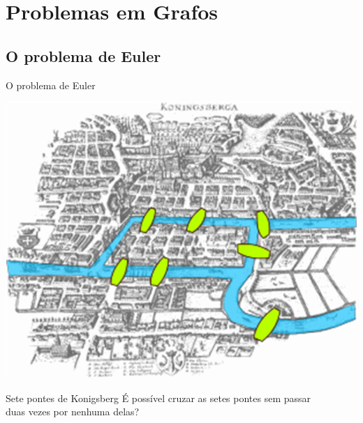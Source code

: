 \documentclass[xcolor=dvipsnames,table]{beamer}
\begin{document}
	\section{Problemas em Grafos}
	\subsection{O problema de Euler}
	\begin{frame}[shrink]{O problema de Euler}
		\begin{center}
    		\includegraphics[height=.6\textheight]{images/konigsberg.png}
  		\end{center} \pause
		\begin{alertblock}{Sete pontes de Konigsberg} \pause
			É possível cruzar as setes pontes sem passar \\
			duas vezes por nenhuma delas?
		\end{alertblock}
	\end{frame}
	
\end{document}
